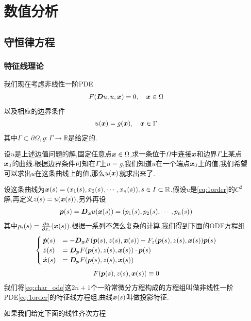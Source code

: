 \newpage
\section{数值分析}
\subsection{守恒律方程}
\subsubsection{特征线理论}
我们现在考虑非线性一阶PDE
\begin{equation}
    F(\bm{D}u,u,\bm{x})=0,\quad \bm{x}\in \Omega
    \label{eq:1order}
\end{equation}
以及相应的边界条件
\begin{equation}
    u(\bm{x})=g(\bm{x}),\quad \bm{x}\in \Gamma
    \label{eq:1order_bc}
\end{equation}
其中$\Gamma\subset\partial\Omega,g:\Gamma\to \mathbb{R}$是给定的.\par
设$u$是上述边值问题的解,固定任意点$\bm{x}\in\Omega$,求一条位于$\Omega$中连接$\bm{x}$和边界$\Gamma$上某点$\bm{x}_0$的曲线.根据边界条件可知在$\Gamma$上$u=g$,我们知道$u$在一个端点$\bm{x}_0$上的值,我们希望可以求出$u$在这条曲线上的值,那么$u(\bm{x})$就求出来了.\par
设这条曲线为$\bm{x}(s)=(x_1(s),x_2(s),\cdots,x_n(s)),s\in I\subset\mathbb{R}$.假设$u$是\eqref{eq:1order}的$C^2$解,再定义$z(s)=u(\bm{x}(s))$,另外再设
$$
\bm{p}(s)=\bm{D}_{\bm{x}}u(\bm{x}(s))=(p_1(s),p_2(s),\cdots,p_n(s))
$$
其中$p_i(s)=\frac{\partial u}{\partial x_i}(\bm{x}(s))$.根据一系列不怎么复杂的计算,我们得到下面的ODE方程组
\begin{equation}
    \begin{cases}
    \dot{\bm{p}}(s) &= -\bm{D}_{\bm{x}}F(\bm{p}(s),z(s),\bm{x}(s))-F_{z}(\bm{p}(s),z(s),\bm{x}(s))\bm{p}(s)\\ 
    \dot{z}(s) &= \bm{D}_{\bm{p}}F(\bm{p}(s),z(s),\bm{x}(s))\cdot\bm{p}(s)\\
    \dot{\bm{x}}(s) &= \bm{D}_{\bm{p}}F(\bm{p}(s),z(s),\bm{x}(s))
\end{cases}
\label{eq:char_ode}
\end{equation}
$$
F(\bm{p}(s),z(s),\bm{x}(s))\equiv 0
$$
我们将\eqref{eq:char_ode}这$2n+1$个一阶常微分方程构成的方程组叫做非线性一阶PDE\eqref{eq:1order}的特征线方程组,曲线$\bm{x}(s)$叫做投影特征.\par
如果我们给定下面的线性齐次方程
